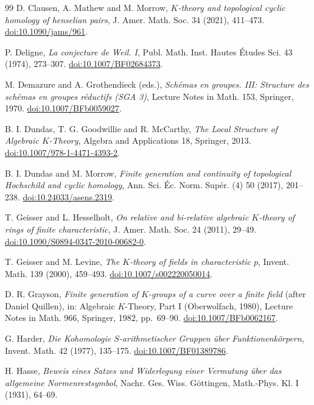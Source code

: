 \begin{thebibliography}{99}
 D. Clausen, A. Mathew and M. Morrow,
\emph{$K$-theory and topological cyclic homology of henselian pairs},
J. Amer. Math. Soc. 34 (2021), 411--473.
\href{https://doi.org/10.1090/jams/961}{doi:10.1090/jams/961}.

 P. Deligne,
\emph{La conjecture de Weil. I},
Publ. Math. Inst. Hautes \'Etudes Sci. 43 (1974), 273--307.
\href{https://doi.org/10.1007/BF02684373}{doi:10.1007/BF02684373}.

 M. Demazure and A. Grothendieck (eds.),
\emph{Sch\'emas en groupes. III: Structure des sch\'emas en groupes r\'eductifs (SGA 3)},
Lecture Notes in Math. 153, Springer, 1970.
\href{https://doi.org/10.1007/BFb0059027}{doi:10.1007/BFb0059027}.

 B. I. Dundas, T. G. Goodwillie and R. McCarthy,
\emph{The Local Structure of Algebraic $K$-Theory},
Algebra and Applications 18, Springer, 2013.
\href{https://doi.org/10.1007/978-1-4471-4393-2}{doi:10.1007/978-1-4471-4393-2}.

 B. I. Dundas and M. Morrow,
\emph{Finite generation and continuity of topological Hochschild and cyclic homology},
Ann. Sci. Éc. Norm. Supér. (4) 50 (2017), 201--238.
\href{https://doi.org/10.24033/asens.2319}{doi:10.24033/asens.2319}.

 T. Geisser and L. Hesselholt,
\emph{On relative and bi-relative algebraic $K$-theory of rings of finite characteristic},
J. Amer. Math. Soc. 24 (2011), 29--49.
\href{https://doi.org/10.1090/S0894-0347-2010-00682-0}{doi:10.1090/S0894-0347-2010-00682-0}.

 T. Geisser and M. Levine,
\emph{The $K$-theory of fields in characteristic $p$},
Invent. Math. 139 (2000), 459--493.
\href{https://doi.org/10.1007/s002220050014}{doi:10.1007/s002220050014}.

 D. R. Grayson,
\emph{Finite generation of $K$-groups of a curve over a finite field} (after Daniel Quillen),
in: Algebraic $K$-Theory, Part I (Oberwolfach, 1980), Lecture Notes in Math. 966, Springer, 1982, pp.~69--90.
\href{https://doi.org/10.1007/BFb0062167}{doi:10.1007/BFb0062167}.

 G. Harder,
\emph{Die Kohomologie $S$-arithmetischer Gruppen über Funktionenkörpern},
Invent. Math. 42 (1977), 135--175.
\href{https://doi.org/10.1007/BF01389786}{doi:10.1007/BF01389786}.

 H. Hasse,
\emph{Beweis eines Satzes und Widerlegung einer Vermutung über das allgemeine Normenrestsymbol},
Nachr. Ges. Wiss. Göttingen, Math.-Phys. Kl. I (1931), 64--69.


\end{thebibliography}
